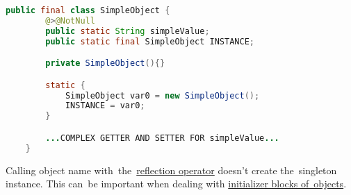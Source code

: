 \begin{lstlisting}[language=Java]
    public final class SimpleObject {
        @>@NotNull
        public static String simpleValue;
        public static final SimpleObject INSTANCE;

        private SimpleObject(){}

        static {
            SimpleObject var0 = new SimpleObject();
            INSTANCE = var0;
        }

        ...COMPLEX GETTER AND SETTER FOR simpleValue...
    }
\end{lstlisting}

\warning Calling object name with~the~\hyperref[kotlinreflection]{reflection operator} doesn't create the~singleton instance.
This can~be important when dealing with \hyperref[objectinitblock]{initializer blocks of~objects}.
